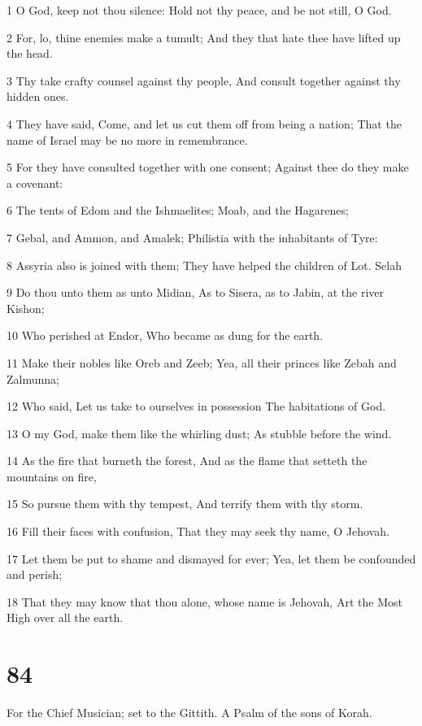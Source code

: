 \par 1 O God, keep not thou silence: Hold not thy peace, and be not still, O God.
\par 2 For, lo, thine enemies make a tumult; And they that hate thee have lifted up the head.
\par 3 Thy take crafty counsel against thy people, And consult together against thy hidden ones.
\par 4 They have said, Come, and let us cut them off from being a nation; That the name of Israel may be no more in remembrance.
\par 5 For they have consulted together with one consent; Against thee do they make a covenant:
\par 6 The tents of Edom and the Ishmaelites; Moab, and the Hagarenes;
\par 7 Gebal, and Ammon, and Amalek; Philistia with the inhabitants of Tyre:
\par 8 Assyria also is joined with them; They have helped the children of Lot. Selah
\par 9 Do thou unto them as unto Midian, As to Sisera, as to Jabin, at the river Kishon;
\par 10 Who perished at Endor, Who became as dung for the earth.
\par 11 Make their nobles like Oreb and Zeeb; Yea, all their princes like Zebah and Zalmunna;
\par 12 Who said, Let us take to ourselves in possession The habitations of God.
\par 13 O my God, make them like the whirling dust; As stubble before the wind.
\par 14 As the fire that burneth the forest, And as the flame that setteth the mountains on fire,
\par 15 So pursue them with thy tempest, And terrify them with thy storm.
\par 16 Fill their faces with confusion, That they may seek thy name, O Jehovah.
\par 17 Let them be put to shame and dismayed for ever; Yea, let them be confounded and perish;
\par 18 That they may know that thou alone, whose name is Jehovah, Art the Most High over all the earth.

\chapter{84}

\par For the Chief Musician; set to the Gittith. A Psalm of the sons of Korah.

